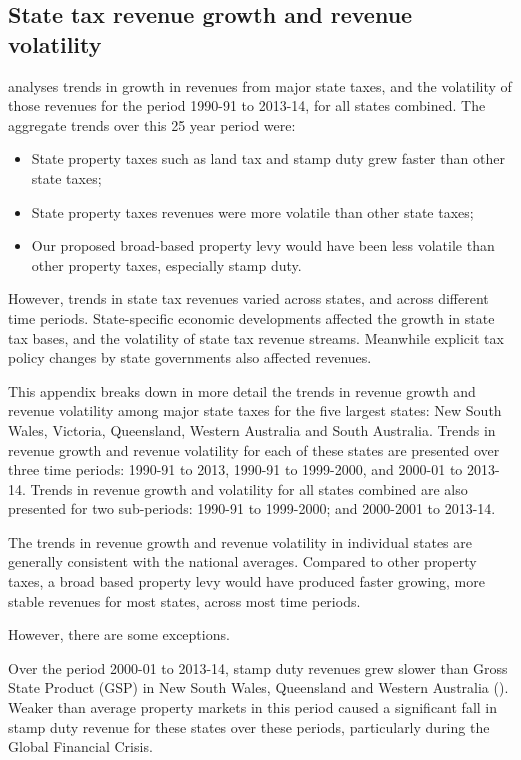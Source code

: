 \documentclass[twoside,english]{palatinob5ona4portrait}
\begin{document}
\begin{subappendices}
\chapter{State tax revenue growth and revenue volatility\label{appendix:PROP}}
 analyses trends in growth in revenues from major state taxes, and the volatility of those revenues for the period 1990-91 to 2013-14, for all states combined. The aggregate trends over this 25 year period were:

\begin{itemize}
\item	State property taxes such as land tax and stamp duty grew faster than other state taxes;
\item	State property taxes revenues were more volatile than other state taxes;
\item	Our proposed broad-based property levy would have been less volatile than other property taxes, especially stamp duty.
\end{itemize}

However, trends in state tax revenues varied across states, and across different time periods. State-specific economic developments affected the growth in state tax bases, and the volatility of state tax revenue streams. Meanwhile explicit tax policy changes by state governments also affected revenues.

This appendix breaks down in more detail the trends in revenue growth and revenue volatility among major state taxes for the five largest states: New South Wales, Victoria, Queensland, Western Australia and South Australia. Trends in revenue growth and revenue volatility for each of these states are presented over three time periods: 1990-91 to 2013, 1990-91 to 1999-2000, and 2000-01 to 2013-14. Trends in revenue growth and volatility for all states combined are also presented for two sub-periods: 1990-91 to 1999-2000; and 2000-2001 to 2013-14.

The trends in revenue growth and revenue volatility in individual states are generally consistent with the national averages. Compared to other property taxes, a broad based property levy would have produced faster growing, more stable revenues for most states, across most time periods.

However, there are some exceptions.  

Over the period 2000-01 to 2013-14, stamp duty revenues grew slower than Gross State Product (GSP) in New South Wales, Queensland and Western Australia (). Weaker than average property markets in this period caused a significant fall in stamp duty revenue for these states over these periods, particularly during the Global Financial Crisis. 


\end{subappendices}
\end{document}
